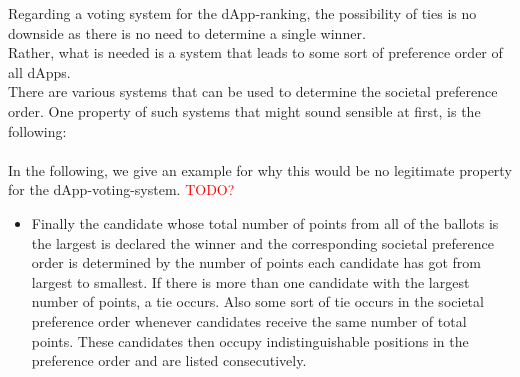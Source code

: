\noindent Regarding a voting system for the dApp-ranking, the possibility of ties is no downside as there is no need to determine a single winner.\\ %
Rather, what is needed is a system that leads to some sort of preference order of all dApps. \\
There are various systems that can be used to determine the societal preference order. One property of such systems that might sound sensible at first, is the following: \\
\\In the following, we give an example for why this would be no legitimate property for the dApp-voting-system. \textcolor{red}{TODO?} 
\begin{itemize}[leftmargin = 0pt, nosep] 
Firstly, each voter submits a ballot that contains his or her individual preference order of all the candidates. 
Then points are awarded to each candidate for each ballot cast, according to the following rule: 
An $m$-place rank is worth $n-m$ points (where $1\leq m \leq n$). In other words, a first-place rank is worth $n-1$ points, a second-place rank is worth $n-2$ points, and so on. 
\item 
Finally the candidate whose total number of points from all of the ballots is the largest is declared the winner and the corresponding societal preference order is determined by the number of points each candidate has got from largest to smallest. If there is more than one candidate with the largest number of points, a tie occurs. Also some sort of tie occurs in the societal preference order whenever candidates receive the same number of total points. These candidates then occupy indistinguishable positions in the preference order and are listed consecutively.
\end{itemize}
 
